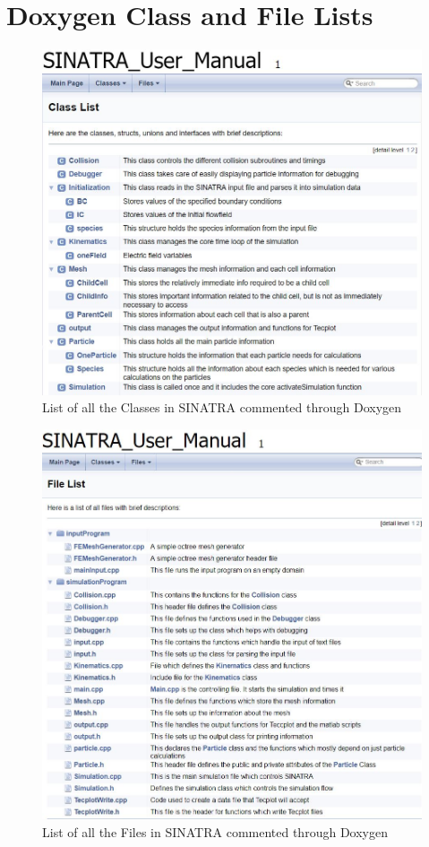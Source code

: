 \chapter{Doxygen Class and File Lists}

\begin{figure}
\includegraphics[width=.95\textwidth]{figures/ClassList.JPG}
\centering
\caption{List of all the Classes in SINATRA commented through Doxygen}
\label{fig:ClassList}
\end{figure}

\begin{figure}
\includegraphics[width=.95\textwidth]{figures/FileList.JPG}
\centering
\caption{List of all the Files in SINATRA commented through Doxygen}
\label{fig:FileList}
\end{figure}


